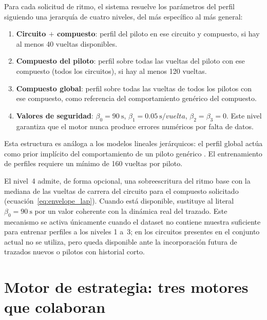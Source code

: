 Para cada solicitud de ritmo, el sistema resuelve los parámetros del perfil siguiendo una jerarquía de cuatro niveles, del más específico al más general:

\begin{enumerate}
    \item \textbf{Circuito $+$ compuesto}: perfil del piloto en ese circuito y compuesto, si hay al menos 40 vueltas disponibles.
    \item \textbf{Compuesto del piloto}: perfil sobre todas las vueltas del piloto con ese compuesto (todos los circuitos), si hay al menos 120 vueltas.
    \item \textbf{Compuesto global}: perfil sobre todas las vueltas de todos los pilotos con ese compuesto, como referencia del comportamiento genérico del compuesto.
    \item \textbf{Valores de seguridad}: $\beta_0 = 90~\si{\second}$, $\beta_1 = 0.05~\si{\second/vuelta}$, $\beta_2 = \beta_3 = 0$. Este nivel garantiza que el motor nunca produce errores numéricos por falta de datos.
\end{enumerate}

Esta estructura es análoga a los modelos lineales jerárquicos: el perfil global actúa como prior implícito del comportamiento de un piloto genérico \cite{raudenbush2002hlm}. El entrenamiento de perfiles requiere un mínimo de 160 vueltas por piloto.

El nivel~4 admite, de forma opcional, una sobreescritura del ritmo base con la mediana de las vueltas de carrera del circuito para el compuesto solicitado (ecuación~\ref{eq:envelope_lap}). Cuando está disponible, sustituye al literal $\beta_0 = 90~\si{\second}$ por un valor coherente con la dinámica real del trazado. Este mecanismo se activa únicamente cuando el dataset no contiene muestra suficiente para entrenar perfiles a los niveles 1 a~3; en los circuitos presentes en el conjunto actual no se utiliza, pero queda disponible ante la incorporación futura de trazados nuevos o pilotos con historial corto.

\section{Motor de estrategia: tres motores que colaboran}
\label{sec:motor_estrategia}

